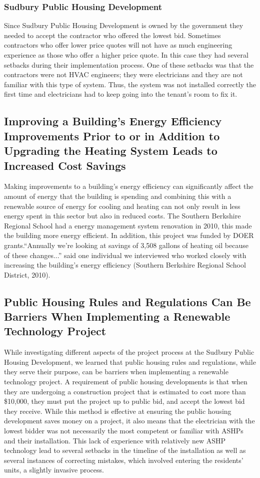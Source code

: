 \subsubsection{Sudbury Public Housing Development}
\par Since Sudbury Public Housing  Development is owned by the government they needed to accept the contractor who offered the lowest bid. Sometimes contractors who offer lower price quotes will not have as much engineering experience as those who offer a higher price quote. In this case they had several setbacks during their implementation process. One of these setbacks was that the contractors were not HVAC engineers; they were electricians and they are not familiar with this type of system. Thus, the system was not installed correctly the first time and electricians had to keep going into the tenant's room to fix it.

\subsection{Improving a Building’s Energy Efficiency Improvements Prior to or in Addition to Upgrading the Heating System Leads to Increased Cost Savings}
\par Making improvements to a building’s energy efficiency can significantly affect the amount of energy that the building is spending and combining this with a renewable source of energy for cooling and heating can not only result in less energy spent in this sector but also in reduced costs. The Southern Berkshire Regional School had a energy management system renovation in 2010, this made the building more energy efficient. In addition, this project was funded by DOER grants.“Annually we’re looking at savings of 3,508 gallons of heating oil because of these changes...” said one individual we interviewed who worked closely with increasing the building’s energy efficiency (Southern Berkshire Regional School District, 2010).

\subsection{Public Housing Rules and Regulations Can Be Barriers When Implementing a Renewable Technology Project}
\par While investigating different aspects of the project process at the Sudbury Public Housing Development, we learned that public housing rules and regulations, while they serve their purpose, can be barriers when implementing a renewable technology project. A requirement of public housing developments is that when they are undergoing a construction project that is estimated to cost more than \$10,000, they must put the project up to public bid, and accept the lowest bid they receive. While this method is effective at ensuring the public housing development saves money on a project, it also means that the electrician with the lowest bidder was not necessarily the most competent or familiar with ASHPs and their installation. This lack of experience with relatively new ASHP technology lead to several setbacks in the timeline of the installation as well as several instances of correcting mistakes, which involved entering the residents’ units, a slightly invasive process.

